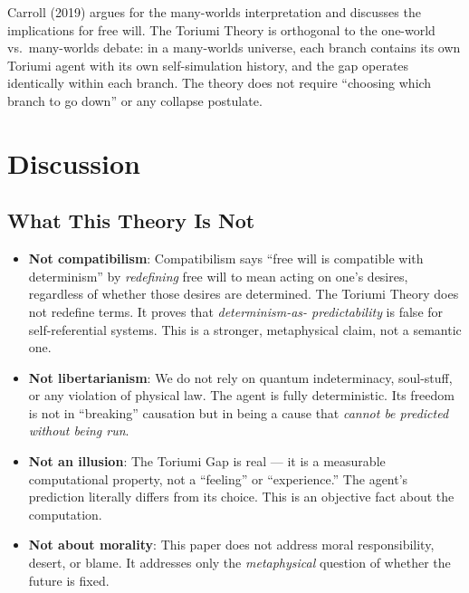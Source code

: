 \documentclass[12pt,a4paper]{article}
\theoremstyle{definition}
\theoremstyle{remark}
\begin{document}
Carroll (2019) \cite{carroll2019} argues for the many-worlds interpretation
and discusses the implications for free will. The Toriumi Theory is orthogonal
to the one-world vs.\ many-worlds debate: in a many-worlds universe, each
branch contains its own Toriumi agent with its own self-simulation history,
and the gap operates identically within each branch. The theory does not
require ``choosing which branch to go down'' or any collapse postulate.

\section{Discussion}

\subsection{What This Theory Is Not}

\begin{itemize}[itemsep=4pt]

\item \textbf{Not compatibilism}: Compatibilism says ``free will is compatible
with determinism'' by \emph{redefining} free will to mean acting on one's
desires, regardless of whether those desires are determined. The Toriumi
Theory does not redefine terms. It proves that \emph{determinism-as-
predictability} is false for self-referential systems. This is a stronger,
metaphysical claim, not a semantic one.

\item \textbf{Not libertarianism}: We do not rely on quantum indeterminacy,
soul-stuff, or any violation of physical law. The agent is fully deterministic.
Its freedom is not in ``breaking'' causation but in being a cause that
\emph{cannot be predicted without being run}.

\item \textbf{Not an illusion}: The Toriumi Gap is real --- it is a measurable
computational property, not a ``feeling'' or ``experience.'' The agent's
prediction literally differs from its choice. This is an objective fact about
the computation.

\item \textbf{Not about morality}: This paper does not address moral
responsibility, desert, or blame. It addresses only the \emph{metaphysical}
question of whether the future is fixed.

\end{itemize}
\end{document}

